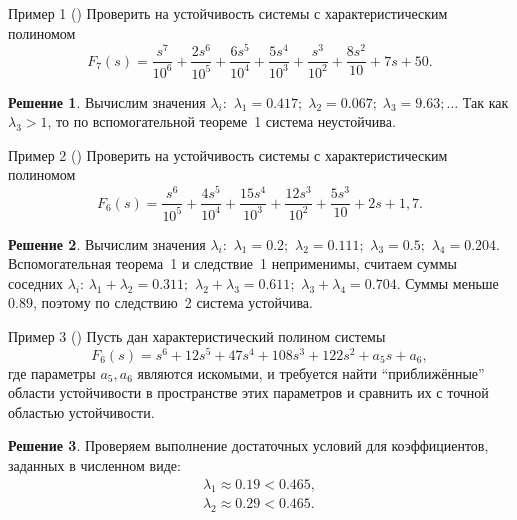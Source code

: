 \documentclass[notheorems,aspectratio=169]{beamer}
\theoremstyle{definition}
\newtheorem{solution}{Решение} %
\begin{document}
\begin{frame}{Пример 1 (\cite{LipatovSokolov1978})}
  Проверить на устойчивость системы с характеристическим полиномом
  \begin{equation*}
    F_7(s) = \frac{s^7}{10^6} + \frac{2 s^6}{10^5} + \frac{6 s^5}{10^4} + \frac{5 s^4}{10^3} + \frac{s^3}{10^2} + \frac{8 s^2}{10} + 7s + 50.
  \end{equation*}

  \begin{solution}
    Вычислим значения $\lambda_i$:~$\lambda_1 = 0.417;\;\lambda_2 = 0.067;\;\lambda_3 = 9.63; \dots$ Так как $\lambda_3 > 1$, то по
    вспомогательной теореме~1 система неустойчива.
  \end{solution}
\end{frame}

\begin{frame}{Пример 2 (\cite{LipatovSokolov1978})}
  Проверить на устойчивость системы с характеристическим полиномом
  \begin{equation*}
    F_6(s) = \frac{s^6}{10^5} + \frac{4 s^5}{10^4} + \frac{15 s^4}{10^3} + \frac{12 s^3}{10^2} + \frac{5 s^3}{10} + 2s + 1,7.
  \end{equation*}

  \begin{solution}
    Вычислим значения $\lambda_i$:~$\lambda_1 = 0.2;$ $\lambda_2 = 0.111;$ $\lambda_3 = 0.5;$ $\lambda_4 = 0.204$. Вспомогательная теорема~1 и следствие~1 неприменимы,
    считаем суммы соседних $\lambda_i$: $\lambda_1 + \lambda_2 = 0.311;$ $\lambda_2 + \lambda_3 = 0.611;$ $\lambda_3 + \lambda_4 = 0.704$. Суммы меньше $0.89$,
    поэтому по следствию~2 система устойчива.
  \end{solution}
\end{frame}

\begin{frame}{Пример 3 (\cite{LipatovSokolov1978})}
  Пусть дан характеристический полином системы
  \begin{equation*}
    F_6(s) = s^6 + 12 s^5 + 47 s^4 + 108 s^3 + 122 s^2 + a_5 s + a_6,
  \end{equation*}
  где параметры $a_5, a_6$ являются искомыми, и требуется найти ``приближённые'' области устойчивости в пространстве
  этих параметров и сравнить их с точной областью устойчивости.

  \begin{solution}
    Проверяем выполнение достаточных условий для коэффициентов, заданных в численном виде:
    \begin{equation*}
      \begin{gathered}
        \lambda_1 \approx 0.19 < 0.465, \\
        \lambda_2 \approx 0.29 < 0.465.
      \end{gathered}
    \end{equation*}
  \end{solution}
\end{frame}
\end{document}
